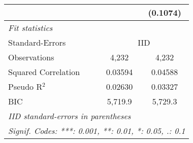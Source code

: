 \begin{tabular}{lcc}
                                         &                 & (0.1074)\\   
   \midrule
   \emph{Fit statistics}\\
   Standard-Errors & \multicolumn{2}{c}{IID} \\ 
   Observations                          & 4,232           & 4,232\\  
   Squared Correlation                   & 0.03594         & 0.04588\\  
   Pseudo R$^2$                          & 0.02630         & 0.03327\\  
   BIC                                   & 5,719.9         & 5,729.3\\  
   \midrule \midrule
   \multicolumn{3}{l}{\emph{IID standard-errors in parentheses}}\\
   \multicolumn{3}{l}{\emph{Signif. Codes: ***: 0.001, **: 0.01, *: 0.05, .: 0.1}}\\
\end{tabular}
\par\endgroup


